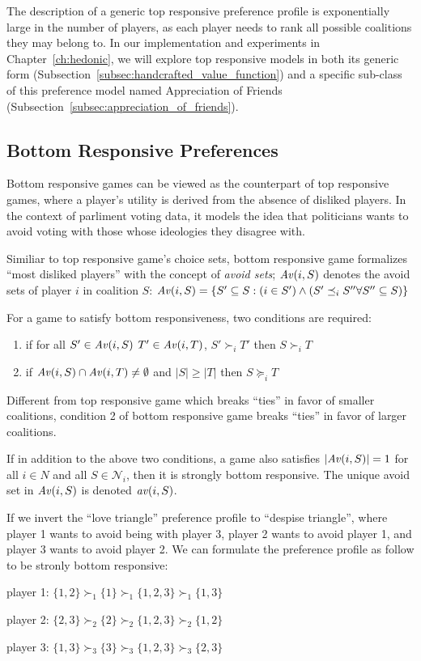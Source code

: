 The description of a generic top responsive preference profile is exponentially
large in the number of players, as each player needs to rank all possible
coalitions they may belong to.
In our implementation and experiments in Chapter~\ref{ch:hedonic}, we will
explore top responsive models in both its generic form
(Subsection~\ref{subsec:handcrafted_value_function}) and a specific sub-class of
this preference model named Appreciation of Friends
(Subsection~\ref{subsec:appreciation_of_friends}).

\subsection{Bottom Responsive Preferences}
\label{subsec:bottom_responsive_preferences}

Bottom responsive games can be viewed as the counterpart of top responsive games,
where a player's utility is derived from the absence of disliked players.
In the context of parliment voting data, it models the idea that politicians wants
to avoid voting with those whose ideologies they disagree with.

Similiar to top responsive game's choice sets, bottom responsive game formalizes
``most disliked players'' with the concept of \textit{avoid sets};
$\mathit{Av}(i, S)$ denotes the avoid sets of player $i$ in coalition $S$: $\mathit{Av}(i, S) =
\{S' \subseteq S: (i \in S') \wedge (S' \preceq_i S'' \forall S'' \subseteq S)\}$

For a game to satisfy bottom responsiveness, two conditions are required:

\begin{enumerate}
  \item if for all $S' \in \mathit{Av}(i, S)$ $T' \in \mathit{Av}(i, T)$, $ S' \succ_i T'$
    then $S \succ_i T$
  \item if $\mathit{Av}(i, S) \cap \mathit{Av}(i, T) \neq \emptyset$ and $|S| \geq |T|$
    then $S \succeq_i T$
\end{enumerate}

Different from top responsive game which breaks ``ties'' in favor of
smaller coalitions, condition 2 of bottom responsive game breaks ``ties'' in
favor of larger coalitions.

If in addition to the above two conditions, a game also satisfies
$|\mathit{Av}(i, S)| = 1$ for all $i \in N$ and all $S \in \mathcal{N}_i$,
then it is strongly bottom responsive. The unique avoid set in $\mathit{Av}(i, S)$
is denoted $\mathit{av}(i, S)$.

\begin{example}
\label{example:bottom_responsive_pref}
  If we invert the ``love triangle'' preference profile to ``despise triangle'',
  where player 1 wants to avoid being with player 3,
  player 2 wants to avoid player 1, and player 3 wants to avoid player 2.
  We can formulate the preference profile as follow to be stronly bottom
  responsive:

  player 1: $\{1, 2\} \succ_1 \{1\} \succ_1 \{1, 2, 3\} \succ_1 \{1, 3\}$

  player 2: $\{2, 3\} \succ_2 \{2\} \succ_2 \{1, 2, 3\} \succ_2 \{1, 2\}$

  player 3: $\{1, 3\} \succ_3 \{3\} \succ_3 \{1, 2, 3\} \succ_3 \{2, 3\}$
\end{example}


